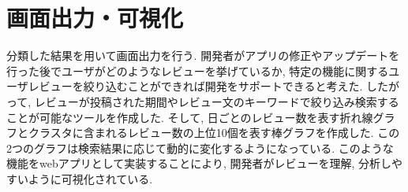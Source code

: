 
\section{画面出力・可視化}
分類した結果を用いて画面出力を行う. 開発者がアプリの修正やアップデートを行った後でユーザがどのようなレビューを挙げているか, 特定の機能に関するユーザレビューを絞り込むことができれば開発をサポートできると考えた. したがって, レビューが投稿された期間やレビュー文のキーワードで絞り込み検索することが可能なツールを作成した. そして, 日ごとのレビュー数を表す折れ線グラフとクラスタに含まれるレビュー数の上位10個を表す棒グラフを作成した. この2つのグラフは検索結果に応じて動的に変化するようになっている. 
このような機能をwebアプリとして実装することにより, 開発者がレビューを理解, 分析しやすいように可視化されている. 
